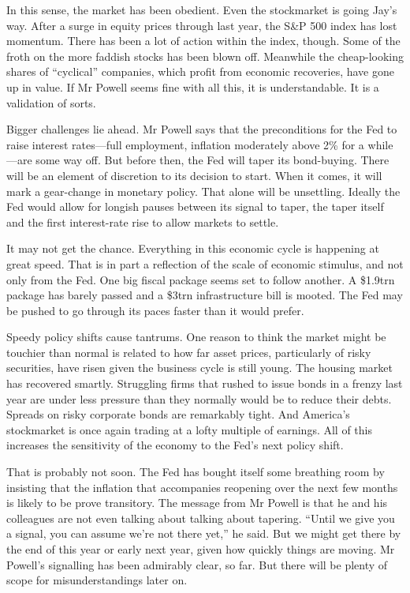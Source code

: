 \documentclass{article}
\begin{document}
In this sense, the market has been obedient. Even the stockmarket is going Jay's way. After a surge in equity prices through last year, the S\&P 500 index has lost momentum. There has been a lot of action within the index, though. Some of the froth on the more faddish stocks has been blown off. Meanwhile the cheap-looking shares of ``cyclical'' companies, which profit from economic recoveries, have gone up in value. If Mr Powell seems fine with all this, it is understandable. It is a validation of sorts. 

Bigger challenges lie ahead. Mr Powell says that the preconditions for the Fed to raise interest rates---full employment, inflation moderately above 2\% for a while---are some way off. But before then, the Fed will taper its bond-buying. There will be an element of discretion to its decision to start. When it comes, it will mark a gear-change in monetary policy. That alone will be unsettling. Ideally the Fed would allow for longish pauses between its signal to taper, the taper itself and the first interest-rate rise to allow markets to settle. 

It may not get the chance. Everything in this economic cycle is happening at great speed. That is in part a reflection of the scale of economic stimulus, and not only from the Fed. One big fiscal package seems set to follow another. A \$1.9trn package has barely passed and a \$3trn infrastructure bill is mooted. The Fed may be pushed to go through its paces faster than it would prefer. 

Speedy policy shifts cause tantrums. One reason to think the market might be touchier than normal is related to how far asset prices, particularly of risky securities, have risen given the business cycle is still young. The housing market has recovered smartly. Struggling firms that rushed to issue bonds in a frenzy last year are under less pressure than they normally would be to reduce their debts. Spreads on risky corporate bonds are remarkably tight. And America's stockmarket is once again trading at a lofty multiple of earnings. All of this increases the sensitivity of the economy to the Fed's next policy shift. 

That is probably not soon. The Fed has bought itself some breathing room by insisting that the inflation that accompanies reopening over the next few months is likely to be prove transitory. The message from Mr Powell is that he and his colleagues are not even talking about talking about tapering. ``Until we give you a signal, you can assume we're not there yet,'' he said. But we might get there by the end of this year or early next year, given how quickly things are moving. Mr Powell's signalling has been admirably clear, so far. But there will be plenty of scope for misunderstandings later on. 
\clearpage
\end{document}
